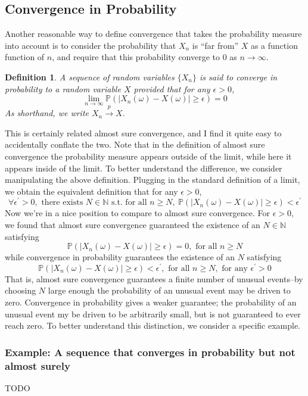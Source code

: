 \documentclass[12pt]{article}
\newcommand*{\abs}[1]{\left\lvert#1\right\rvert}
\newcommand{\Prob}{\mathbb{P}}
\newtheorem{definition}{Definition}
\begin{document}
\subsection{Convergence in Probability}
Another reasonable way to define convergence that takes the probability measure into account is to consider the probability that $X_n$ is ``far from'' $X$ as a function function of $n$, and require that this 
probability converge to $0$ as $n \to \infty$.  
\begin{definition}
A sequence of random variables $\{X_n\}$ is said to converge in probability to a random variable $X$ provided that for any $\epsilon > 0$,
\[\lim_{n \to \infty} \Prob\left(\abs{X_n(\omega) - X(\omega)} \geq \epsilon \right) = 0\]
As shorthand, we write $X_n \overset{p}{\to} X$.
\end{definition}
This is certainly related almost sure convergence, and I find it quite easy to accidentally conflate the two. Note that in the definition of almost sure convergence the probability measure appears outside of the limit, 
while here it appears inside of the limit. To better understand the difference, we consider manipulating the above definition. 
Plugging in the standard definition of a limit, we obtain the equivalent 
definition that for any $\epsilon > 0$,
\[\forall \epsilon^\prime > 0, \text{ there exists } N \in \mathbb{N} \text{ s.t. for all } n \geq N, \ \Prob\left(\abs{X_n(\omega) - X(\omega)} \geq \epsilon \right) < \epsilon^\prime \]
Now we're in a nice position to compare to almost sure convergence. For $\epsilon > 0$, we found that almost sure convergence guaranteed the existence of an $N \in \mathbb{N}$
satisfying 
\[\Prob(\abs{X_n(\omega) - X(\omega)} \geq \epsilon) = 0, \text{ for all } n \geq N\]
while convergence in probability guarantees the existence of an $N$ satisfying 
\[\Prob(\abs{X_n(\omega) - X(\omega)} \geq \epsilon) < \epsilon^\prime, \text{ for all } n \geq N, \text{ for any } \epsilon^\prime > 0\]
That is, almost sure convergence guarantees a finite number of unusual events--by choosing $N$ large enough the probability of an unusual event may be driven to zero. Convergence in 
probability gives a weaker guarantee; the probability of an unusual event my be driven to be arbitrarily small, but is not guaranteed to ever reach zero. To better understand this distinction, 
we consider a specific example. 

\subsubsection{Example: A sequence that converges in probability but not almost surely}
TODO
\end{document}
